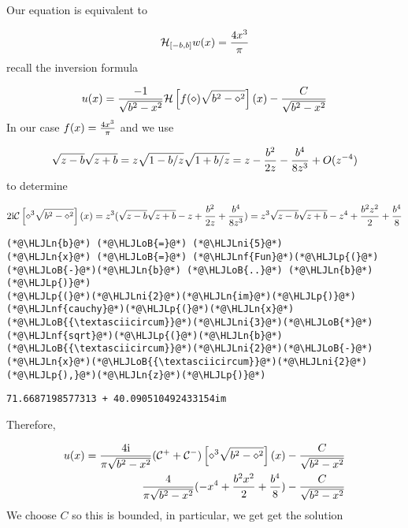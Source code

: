 \documentclass[12pt,landscape]{article}
\newcommand{\HLJLn}[1]{#1}
\newcommand{\HLJLnf}[1]{\textcolor[RGB]{66,102,213}{#1}}
\newcommand{\HLJLni}[1]{\textcolor[RGB]{59,151,46}{#1}}
\newcommand{\HLJLoB}[1]{\textcolor[RGB]{102,102,102}{\textbf{#1}}}
\newcommand{\HLJLp}[1]{#1}
\def\I{ {\rm i} }
\def\CC{ {\cal C} }
\def\HH{ {\cal H} }
\begin{document}
{\begin{itemize}
\end{itemize}
\newpage
Our equation is equivalent to

\[
\HH_{[-b,b]} w(x) = {4 x^3 \over \pi}
\]
recall the inversion formula

\[
    u(x) =  {-1 \over \sqrt{b^2 - x^2}}\HH \left[{ f(\diamond)  \sqrt{b^2-\diamond^2} }\right](x)  - {C \over \sqrt{b^2-x^2}}
\]
In our case $f(x) = {4 x^3 \over \pi}$ and we use

\[
\sqrt{z-b}\sqrt{z+b} = z\sqrt{1-b/z}\sqrt{1+b/z} = z - {b^2 \over 2 z} -{b^4 \over 8z^3} + O(z^{-4})
\]
to determine

\[
2 \I \CC \left[{ \diamond^3  \sqrt{b^2-\diamond^2} }\right](x) =
z^3(\sqrt{z-b}\sqrt{z+b} -z +  {b^2 \over 2 z} + {b^4 \over 8z^3}) = z^3\sqrt{z-b}\sqrt{z+b} -z^4 +  {b^2z^2 \over 2} + {b^4 \over 8}
\]

\begin{lstlisting}
(*@\HLJLn{b}@*) (*@\HLJLoB{=}@*) (*@\HLJLni{5}@*)
(*@\HLJLn{x}@*) (*@\HLJLoB{=}@*) (*@\HLJLnf{Fun}@*)(*@\HLJLp{(}@*)(*@\HLJLoB{-}@*)(*@\HLJLn{b}@*) (*@\HLJLoB{..}@*) (*@\HLJLn{b}@*)(*@\HLJLp{)}@*)
(*@\HLJLp{(}@*)(*@\HLJLni{2}@*)(*@\HLJLn{im}@*)(*@\HLJLp{)}@*)(*@\HLJLnf{cauchy}@*)(*@\HLJLp{(}@*)(*@\HLJLn{x}@*)(*@\HLJLoB{{\textasciicircum}}@*)(*@\HLJLni{3}@*)(*@\HLJLoB{*}@*)(*@\HLJLnf{sqrt}@*)(*@\HLJLp{(}@*)(*@\HLJLn{b}@*)(*@\HLJLoB{{\textasciicircum}}@*)(*@\HLJLni{2}@*)(*@\HLJLoB{-}@*)(*@\HLJLn{x}@*)(*@\HLJLoB{{\textasciicircum}}@*)(*@\HLJLni{2}@*)(*@\HLJLp{),}@*)(*@\HLJLn{z}@*)(*@\HLJLp{)}@*)
\end{lstlisting}

\begin{lstlisting}
71.6687198577313 + 40.090510492433154im
\end{lstlisting}


Therefore,


\begin{align*}
u(x) = {4\I \over \pi \sqrt{b^2 - x^2}}(\CC^+ + \CC^-) \left[{ \diamond^3  \sqrt{b^2-\diamond^2} }\right](x)  - {C \over \sqrt{b^2-x^2}} \\
{4 \over \pi \sqrt{b^2 - x^2}}(-x^4+{b^2 x^2 \over 2} + {b^4 \over 8})- {C \over \sqrt{b^2-x^2}}
\end{align*}
We choose $C$ so this is bounded, in particular, we get get the solution

}
\end{document}
